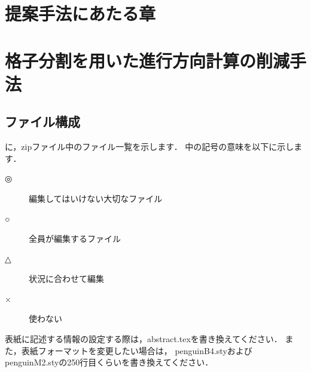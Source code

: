 \chapter{提案手法にあたる章}
\chapter{格子分割を用いた進行方向計算の削減手法}
\label{sec:method}

\section{ファイル構成}


に，zipファイル中のファイル一覧を示します．
中の記号の意味を以下に示します．
\begin{description}
\item[◎]編集してはいけない大切なファイル
\item[○]全員が編集するファイル
\item[△]状況に合わせて編集
\item[×]使わない
\end{description}

表紙に記述する情報の設定する際は，abstract.texを書き換えてください．
また，表紙フォーマットを変更したい場合は，
penguinB4.styおよびpenguinM2.styの250行目くらいを書き換えてください．



